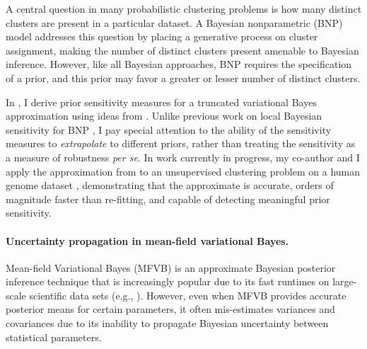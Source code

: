 A central question in many probabilistic clustering problems is how many
distinct clusters are present in a particular dataset. A Bayesian nonparametric
(BNP) model addresses this question by placing a generative process on cluster
assignment, making the number of distinct clusters present amenable to Bayesian
inference.  However, like all Bayesian approaches, BNP requires the
specification of a prior, and this prior may favor a greater or lesser number of
distinct clusters.

In \citep{giordano:2018:bnpsensitivity}, I derive prior sensitivity measures for
a truncated variational Bayes approximation using ideas from \citep{gustafson:1996:localposterior,
giordano:2018:covariances}. Unlike previous work on local Bayesian sensitivity
for BNP \citep{Basu:2000:BNP_robustness}, I pay special attention to the
ability of the sensitivity measures to \emph{extrapolate} to different priors,
rather than treating the sensitivity as a measure of robustness \textit{per se}.
In work currently in progress, my co-author and I apply the approximation from
\citep{giordano:2018:bnpsensitivity} to an unsupervised clustering problem on a
human genome dataset \citep{huang:2011:haplotype, raj:2014:faststructure},
demonstrating that the approximate is accurate, orders of magnitude faster than
re-fitting, and capable of detecting meaningful prior sensitivity.


\paragraph{Uncertainty propagation in mean-field variational Bayes.}

Mean-field Variational Bayes (MFVB) is an approximate Bayesian posterior
inference technique that is increasingly popular due to its fast runtimes on
large-scale scientific data sets (e.g., \citet{raj:2014:faststructure,
kucukelbir:2017:advi, regier:2019:cataloging}). However, even when MFVB provides
accurate posterior means for certain parameters, it often mis-estimates
variances and covariances \citep{wang:2005:inadequacy, turner:2011:two} due to
its inability to propagate Bayesian uncertainty between statistical parameters.

